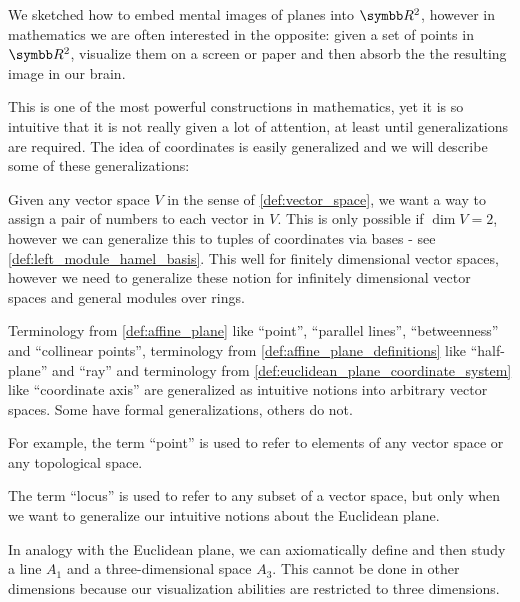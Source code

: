 \begin{remark}\label{remark:coordinate_systems}
  We sketched how to embed mental images of planes into \( \R^2 \), however in mathematics we are often interested in the opposite: given a set of points in \( \R^2 \), visualize them on a screen or paper and then absorb the the resulting image in our brain.

  This is one of the most powerful constructions in mathematics, yet it is so intuitive that it is not really given a lot of attention, at least until generalizations are required. The idea of coordinates is easily generalized and we will describe some of these generalizations:
  \begin{remenum}
     Given any vector space \( V \) in the sense of \cref{def:vector_space}, we want a way to assign a pair of numbers to each vector in \( V \). This is only possible if \( \dim V = 2 \), however we can generalize this to tuples of coordinates via bases - see \cref{def:left_module_hamel_basis}. This well for finitely dimensional vector spaces, however we need to generalize these notion for infinitely dimensional vector spaces and general modules over rings.

     Terminology from \cref{def:affine_plane} like \enquote{point}, \enquote{parallel lines}, \enquote{betweenness} and \enquote{collinear points}, terminology from \cref{def:affine_plane_definitions} like \enquote{half-plane} and \enquote{ray} and terminology from \cref{def:euclidean_plane_coordinate_system} like \enquote{coordinate axis} are generalized as intuitive notions into arbitrary vector spaces. Some have formal generalizations, others do not.

    For example, the term \enquote{point} is used to refer to elements of any vector space or any topological space.

     The term \enquote{locus} is used to refer to any subset of a vector space, but only when we want to generalize our intuitive notions about the Euclidean plane.

     In analogy with the Euclidean plane, we can axiomatically define and then study a line \( A_1 \) and a three-dimensional space \( A_3 \). This cannot be done in other dimensions because our visualization abilities are restricted to three dimensions.


\end{remenum}
\end{remark}
